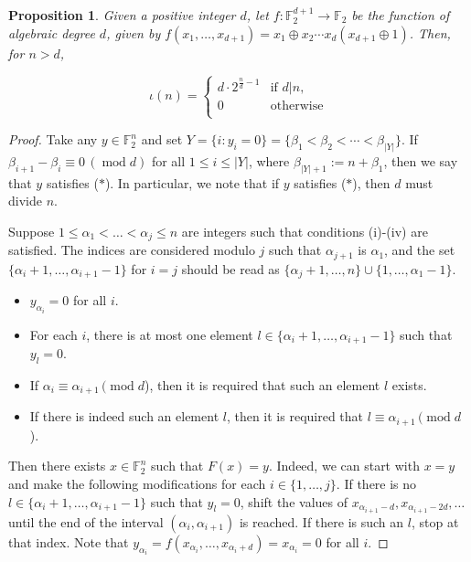 \documentclass[11pt,english,a4paper]{amsart}
\theoremstyle{plain}
\newtheorem{proposition}[theorem]{Proposition}
\theoremstyle{definition}
\theoremstyle{remark}
\newcommand{\F}{\mathbb{F}}
\begin{document}
	\begin{proposition}\label{virtual}
		Given a positive integer $d$, let $f\colon\F_2^{d+1}\to\F_2$ be the function of algebraic degree $d$, given by $f(x_1,\dotsc,x_{d+1}) = x_1 \oplus x_2 \dotsm x_d (x_{d+1} \oplus 1)$. Then, for $n > d$,
		
		\begin{equation}\label{eq:virtual}
			\iota(n) = 
			\begin{cases}
				d \cdot 2^{\frac{n}{d}-1} & \text{if }d|n,\\
				0 & \text{otherwise}\\ 
			\end{cases} 
		\end{equation}
	\end{proposition}
	
	\begin{proof}
		Take any $y \in \F_2^n$ and set $Y=\{ i : y_i=0 \}=\{ \beta_1<\beta_2<\dotsb<\beta_{\lvert Y\rvert} \}$. If $\beta_{i+1}-\beta_i\equiv 0\, (\operatorname{mod} d)$ for all $1\leq i\leq\lvert Y\rvert$, where $\beta_{\lvert Y\rvert+1}:=n+\beta_1$, then we say that $y$ satisfies ($*$). In particular, we note that if $y$ satisfies ($*$), then $d$ must divide $n$.
		
		Suppose $1 \leq \alpha_1 < \dotsc < \alpha_j \leq n$ are integers such that conditions (i)-(iv) are satisfied. The indices are considered modulo $j$ such that $\alpha_{j+1}$ is $\alpha_1$, and the set $\{\alpha_i+1, \dotsc, \alpha_{i+1}-1\}$ for $i=j$ should be read as $\{\alpha_j+1, \dotsc, n\} \cup \{1, \dotsc, \alpha_1-1\}$.
		\begin{itemize}
			\item[(i)] $y_{\alpha_i} = 0$ for all $i$.
			\item[(ii)] For each $i$, there is at most one element $l \in \{\alpha_i+1, \dotsc, \alpha_{i+1}-1\}$ such that $y_l=0$.
			\item[(iii)] If $\alpha_i \equiv \alpha_{i+1}\, (\operatorname{mod} d$), then it is required that such an element $l$ exists.
			\item[(iv)] If there is indeed such an element $l$, then it is required that $l \equiv \alpha_{i+1}\, (\operatorname{mod} d$).
		\end{itemize}
		Then there exists $x \in \F_2^n$ such that $F(x)=y$. Indeed, we can start with $x=y$ and make the following modifications for each $i \in \{1, \dotsc, j\}$. If there is no $l \in \{\alpha_i+1, \dotsc, \alpha_{i+1}-1\}$ such that $y_l=0$, shift the values of $x_{\alpha_{i+1}-d}, x_{\alpha_{i+1}-2d}, \dotsc$ until the end of the interval $(\alpha_i, \alpha_{i+1})$ is reached. If there is such an $l$, stop at that index. Note that $y_{\alpha_i} = f(x_{\alpha_i}, \dotsc, x_{\alpha_i+d}) = x_{\alpha_i} = 0$ for all $i$.
		

\end{proof}
\end{document}
